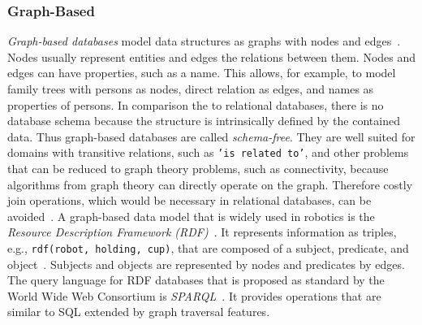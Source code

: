 \subsubsection{Graph-Based}
\label{sec:graph-design}
\emph{Graph-based databases} model data structures as graphs with nodes and
edges~\cite{graphdbs}. Nodes usually represent entities and edges the
relations between them. Nodes and edges can have properties, such as a
name. This allows, for example, to model family trees with persons as
nodes, direct relation as edges, and names as properties of persons. In
comparison the to relational databases, there is no database schema
because the structure is intrinsically defined by the contained
data. Thus graph-based databases are called \emph{schema-free}. They
are well suited for domains with transitive relations, such as \texttt{'is
related to'}, and other problems that can be reduced to graph theory
problems, such as connectivity, because algorithms from graph theory
can directly operate on the graph. Therefore costly join operations, which
would be necessary in relational databases, can be
avoided~\cite{graphcomparison}. A graph-based data model that is
widely used in robotics is the \emph{Resource Description Framework
  (RDF)}~\cite{KnowRob-Representation,Oro,OpenEASE}. It represents
information as triples, e.g., \texttt{rdf(robot, holding, cup)}, that are
composed of a subject, predicate, and object~\cite{rdf}. Subjects and
objects are represented by nodes and predicates by edges. The query
language for RDF databases that is proposed as standard by the World
Wide Web Consortium is \emph{SPARQL}~\cite{sparql}. It provides operations that are
similar to SQL extended by graph traversal features.

